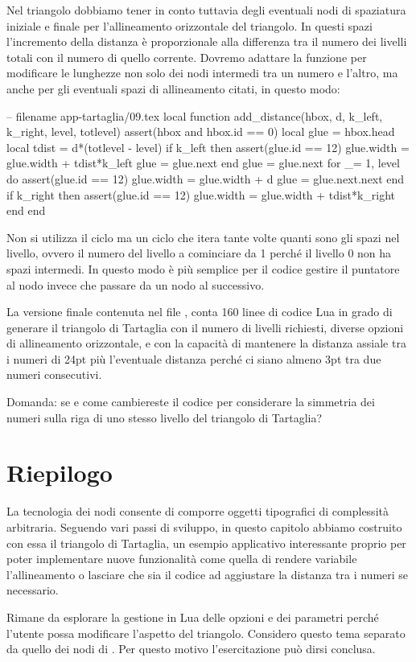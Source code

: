 Nel triangolo dobbiamo tener in conto tuttavia degli eventuali nodi di
spaziatura iniziale e finale per l'allineamento orizzontale del triangolo. In
questi spazi l'incremento della distanza è proporzionale alla differenza tra il
numero dei livelli totali con il numero di quello corrente. Dovremo adattare la
funzione  per modificare le lunghezze non solo dei nodi
intermedi tra un numero e l'altro, ma anche per gli eventuali spazi di
allineamento citati, in questo modo:
\begin{lines}
-- filename app-tartaglia/09.tex
local
function add_distance(hbox, d, k_left, k_right, level, totlevel)
    assert(hbox and hbox.id == 0)
    local glue = hbox.head
    local tdist = d*(totlevel - level)
    if k_left then
        assert(glue.id == 12)
        glue.width = glue.width + tdist*k_left
        glue = glue.next
    end
    glue = glue.next
    for _= 1, level do
        assert(glue.id == 12)
        glue.width = glue.width + d
        glue = glue.next.next
    end
    if k_right then
        assert(glue.id == 12)
        glue.width = glue.width +  tdist*k_right
    end
end
\end{lines}

Non si utilizza il ciclo  ma un ciclo  che itera tante
volte quanti sono gli spazi nel livello, ovvero il numero del livello a
cominciare da 1 perché il livello 0 non ha spazi intermedi. In questo modo è più
semplice per il codice gestire il puntatore al nodo invece che passare da un
nodo al successivo.

La versione finale contenuta nel file , conta 160
linee di codice Lua in grado di generare il triangolo di Tartaglia con il numero
di livelli richiesti, diverse opzioni di allineamento orizzontale, e con la
capacità di mantenere la distanza assiale tra i numeri di 24pt più l'eventuale
distanza perché ci siano almeno 3pt tra due numeri consecutivi.

Domanda: se e come cambiereste il codice per considerare la simmetria dei numeri
sulla riga di uno stesso livello del triangolo di Tartaglia?


\section{Riepilogo}

La tecnologia dei nodi consente di comporre oggetti tipografici di complessità
arbitraria. Seguendo vari passi di sviluppo, in questo capitolo abbiamo
costruito con essa il triangolo di Tartaglia, un esempio applicativo
interessante proprio per poter implementare nuove funzionalità come quella di
rendere variabile l'allineamento o lasciare che sia il codice ad aggiustare la
distanza tra i numeri se necessario.

Rimane da esplorare la gestione in Lua delle opzioni e dei parametri perché
l'utente possa modificare l'aspetto del triangolo. Considero questo tema
separato da quello dei nodi di \LuaTeX{}. Per questo motivo l'esercitazione
può dirsi conclusa.



